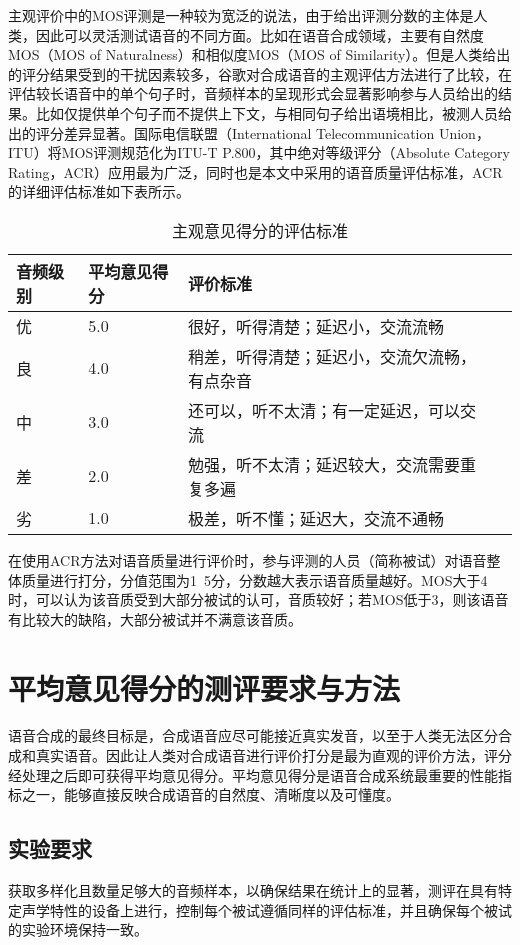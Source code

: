 \documentclass[cn,10pt,math=newtx,citestyle=gb7714-2015,bibstyle=gb7714-2015]{elegantbook}
\begin{document}
主观评价中的MOS评测是一种较为宽泛的说法，由于给出评测分数的主体是人类，因此可以灵活测试语音的不同方面。比如在语音合成领域，主要有自然度MOS（MOS of Naturalness）和相似度MOS（MOS of Similarity）。但是人类给出的评分结果受到的干扰因素较多，谷歌对合成语音的主观评估方法进行了比较，在评估较长语音中的单个句子时，音频样本的呈现形式会显著影响参与人员给出的结果。比如仅提供单个句子而不提供上下文，与相同句子给出语境相比，被测人员给出的评分差异显著。国际电信联盟（International Telecommunication Union，ITU）将MOS评测规范化为ITU-T P.800，其中绝对等级评分（Absolute Category Rating，ACR）应用最为广泛，同时也是本文中采用的语音质量评估标准，ACR的详细评估标准如下表所示。

\begin{table}[htbp]
  \centering
  \caption{主观意见得分的评估标准}
    \begin{tabular}{llll}
    \toprule
    音频级别 & 平均意见得分 & 评价标准 \\
    \midrule
    优 & 5.0 & 很好，听得清楚；延迟小，交流流畅 \\
    良 & 4.0 & 稍差，听得清楚；延迟小，交流欠流畅，有点杂音 \\
    中 & 3.0 & 还可以，听不太清；有一定延迟，可以交流 \\
    差 & 2.0 & 勉强，听不太清；延迟较大，交流需要重复多遍 \\
    劣 & 1.0 & 极差，听不懂；延迟大，交流不通畅 \\
    \bottomrule
    \end{tabular}%
\end{table}%

在使用ACR方法对语音质量进行评价时，参与评测的人员（简称被试）对语音整体质量进行打分，分值范围为1~5分，分数越大表示语音质量越好。MOS大于4时，可以认为该音质受到大部分被试的认可，音质较好；若MOS低于3，则该语音有比较大的缺陷，大部分被试并不满意该音质。

\section{平均意见得分的测评要求与方法}
语音合成的最终目标是，合成语音应尽可能接近真实发音，以至于人类无法区分合成和真实语音。因此让人类对合成语音进行评价打分是最为直观的评价方法，评分经处理之后即可获得平均意见得分。平均意见得分是语音合成系统最重要的性能指标之一，能够直接反映合成语音的自然度、清晰度以及可懂度。
\subsection{实验要求}
获取多样化且数量足够大的音频样本，以确保结果在统计上的显著，测评在具有特定声学特性的设备上进行，控制每个被试遵循同样的评估标准，并且确保每个被试的实验环境保持一致。
\end{document}
